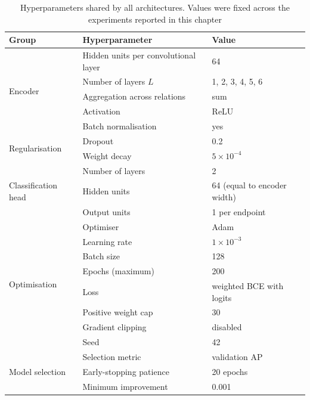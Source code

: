 \begin{table}[htbp]
  \centering
  \caption{Hyperparameters shared by all architectures. Values were fixed
    across the experiments reported in this chapter}
  \label{tab:hparams-common}
  \begin{tabular}{lll}
    \toprule
    Group & Hyperparameter & Value \\
    \midrule
    \multirow{5}{*}{Encoder}
      & Hidden units per convolutional layer & 64 \\
      & Number of layers $L$                 & 1, 2, 3, 4, 5, 6 \\
      & Aggregation across relations         & sum \\
      & Activation                           & ReLU \\
      & Batch normalisation                  & yes \\
    \midrule
    \multirow{2}{*}{Regularisation}
      & Dropout                              & 0.2 \\
      & Weight decay                         & $5\times10^{-4}$ \\
    \midrule
    \multirow{3}{*}{Classification head}
      & Number of layers                     & 2 \\
      & Hidden units                         & 64 (equal to encoder width) \\
      & Output units                         & 1 per endpoint \\
    \midrule
    \multirow{8}{*}{Optimisation}
      & Optimiser                            & Adam \\
      & Learning rate                        & $1\times10^{-3}$ \\
      & Batch size                           & 128 \\
      & Epochs (maximum)                     & 200 \\
      & Loss                                 & weighted BCE with logits \\
      & Positive weight cap                  & 30 \\
      & Gradient clipping                    & disabled \\
      & Seed                                 & 42 \\
    \midrule
    \multirow{3}{*}{Model selection}
      & Selection metric                     & validation AP \\
      & Early-stopping patience              & 20 epochs \\
      & Minimum improvement                  & 0.001 \\
    \bottomrule
  \end{tabular}
\end{table}

